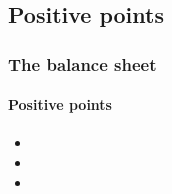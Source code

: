 \documentclass[a4paper, 11pt]{beamer}
\begin{document}
\subsection{Positive points}
\begin{frame}
 \frametitle{The balance sheet}
 \framesubtitle{Positive points}
 \begin{itemize}
  \item 
  \item 
  \item 
 \end{itemize}
\end{frame}
\end{document}
